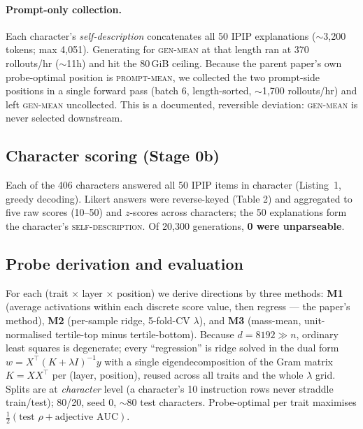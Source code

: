\documentclass[11pt]{article}
\begin{document}
\paragraph{Prompt-only collection.} Each character's \emph{self-description}
concatenates all 50 IPIP explanations ($\sim$3{,}200 tokens; max 4{,}051).
Generating for \textsc{gen-mean} at that length ran at 370 rollouts/hr ($\sim$11h)
and hit the 80\,GiB ceiling. Because the parent paper's own probe-optimal position
is \textsc{prompt-mean}, we collected the two prompt-side positions in a single
forward pass (batch 6, length-sorted, $\sim$1{,}700 rollouts/hr) and left
\textsc{gen-mean} uncollected. This is a documented, reversible deviation:
\textsc{gen-mean} is never selected downstream.

\subsection{Character scoring (Stage 0b)}
Each of the 406 characters answered all 50 IPIP items in character
(Listing~1, greedy decoding). Likert answers were reverse-keyed (Table 2) and
aggregated to five raw scores (10--50) and $z$-scores across characters; the 50
explanations form the character's \textsc{self-description}. Of 20{,}300
generations, \textbf{0 were unparseable}.

\subsection{Probe derivation and evaluation}
For each (trait $\times$ layer $\times$ position) we derive directions by three
methods: \textbf{M1} (average activations within each discrete score value, then
regress --- the paper's method), \textbf{M2} (per-sample ridge, 5-fold-CV
$\lambda$), and \textbf{M3} (mass-mean, unit-normalised
tertile-top minus tertile-bottom). Because $d{=}8192\gg n$, ordinary least
squares is degenerate; every ``regression'' is ridge solved in the dual form
$w = X^\top(K+\lambda I)^{-1}y$ with a single eigendecomposition of the Gram
matrix $K=XX^\top$ per (layer, position), reused across all traits and the whole
$\lambda$ grid. Splits are at \emph{character} level (a character's 10 instruction
rows never straddle train/test); 80/20, seed 0, $\sim$80 test characters.
Probe-optimal per trait maximises $\tfrac12(\text{test }\rho+\text{adjective AUC})$.
\end{document}
